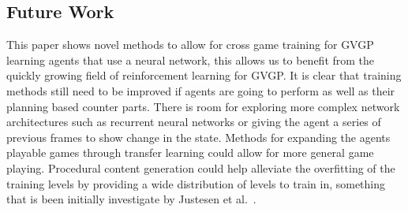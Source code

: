 \subsection{Future Work}
This paper shows novel methods to allow for cross game training for GVGP learning agents that use a neural network, this allows us to benefit from the quickly growing field of reinforcement learning for GVGP.
It is clear that training methods still need to be improved if agents are going to perform as well as their planning based counter parts.
There is room for exploring more complex network architectures such as recurrent neural networks or giving the agent a series of previous frames to show change in the state.
Methods for expanding the agents playable games through transfer learning could allow for more general game playing.
Procedural content generation could help alleviate the overfitting of the training levels by providing a wide distribution of levels to train in, something that is been initially investigate by Justesen et al.~\cite{PCG}.